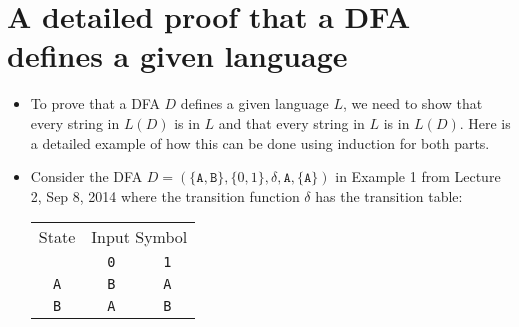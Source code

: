 \documentclass[]{article}
\begin{document}
\section{A detailed proof that a DFA defines a given language}
  \begin{itemize}
    \item To prove that a DFA $D$ defines a given language $L$, we need to show
    that every string in $L(D)$ is in $L$ and that every string in $L$ is in
    $L(D)$. Here is a detailed example of how this can be done using induction
    for both parts.
    \item Consider the DFA $D = (\{\texttt{A},\texttt{B}\}, \{0, 1\}, \delta,
    \texttt{A}, \{\texttt{A}\})$ in Example 1 from Lecture 2, Sep 8, 2014 where
    the transition function $\delta$ has the transition table: \\

      \begin{tabular}{|c|c|c|}
        \hline
             State & \multicolumn{2}{|c|}{Input Symbol} \\ \cline{2-3}
                   & \texttt{0} & \texttt{1} \\ \hline
        \texttt{A} & \texttt{B} & \texttt{A} \\ \hline
        \texttt{B} & \texttt{A} & \texttt{B} \\ \hline
      \end{tabular}


\end{itemize}
\end{document}
